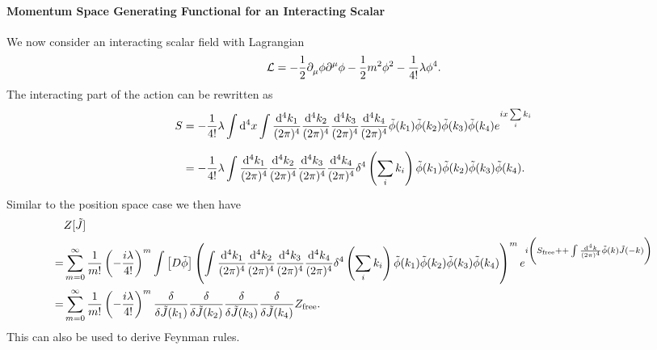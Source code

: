 \paragraph{Momentum Space Generating Functional for an Interacting Scalar}
We now consider an interacting scalar field with Lagrangian
\begin{align*}
	\mathcal{L} = -\frac{1}{2}\partial^{}_{\mu}\phi\partial^{\mu}_{}\phi - \frac{1}{2}m^{2}\phi^{2} - \frac{1}{4!}\lambda\phi^{4}.
\end{align*}
The interacting part of the action can be rewritten as
\begin{align*}
	S &= -\frac{1}{4!}\lambda\int\limits_{}^{}\dd[4]{x}\int\limits_{}^{}\frac{\dd[4]{k_{1}}}{(2\pi)^{4}}\frac{\dd[4]{k_{2}}}{(2\pi)^{4}}\frac{\dd[4]{k_{3}}}{(2\pi)^{4}}\frac{\dd[4]{k_{4}}}{(2\pi)^{4}}\tilde{\phi}(k_{1})\tilde{\phi}(k_{2})\tilde{\phi}(k_{3})\tilde{\phi}(k_{4})e^{ix\sum\limits_{i}k_{i}} \\
	  &= -\frac{1}{4!}\lambda\int\limits_{}^{}\frac{\dd[4]{k_{1}}}{(2\pi)^{4}}\frac{\dd[4]{k_{2}}}{(2\pi)^{4}}\frac{\dd[4]{k_{3}}}{(2\pi)^{4}}\frac{\dd[4]{k_{4}}}{(2\pi)^{4}}\delta^{4}\left(\sum\limits_{i}k_{i}\right)\tilde{\phi}(k_{1})\tilde{\phi}(k_{2})\tilde{\phi}(k_{3})\tilde{\phi}(k_{4}).
\end{align*}
Similar to the position space case we then have
\begin{align*}
	 &Z[\tilde{J}] \\
	=& \sum\limits_{m = 0}^{\infty}\frac{1}{m!}\left(-\frac{i\lambda}{4!}\right)^{m}\pinte{}{\tilde{\phi}}\left(\inte{}{}\frac{\dd[4]{k_{1}}}{(2\pi)^{4}}\frac{\dd[4]{k_{2}}}{(2\pi)^{4}}\frac{\dd[4]{k_{3}}}{(2\pi)^{4}}\frac{\dd[4]{k_{4}}}{(2\pi)^{4}}\delta^{4}\left(\sum\limits_{i}k_{i}\right)\tilde{\phi}(k_{1})\tilde{\phi}(k_{2})\tilde{\phi}(k_{3})\tilde{\phi}(k_{4})\right)^{m}e^{i\left(S_{\text{free}} +  + \inte{}{}\frac{\dd[4]{k}}{(2\pi)^{4}}\tilde{\phi}(k)\tilde{J}(-k)\right)} \\
	=& \sum\limits_{m = 0}^{\infty}\frac{1}{m!}\left(-\frac{i\lambda}{4!}\right)^{m}\fdv{\tilde{J}(k_{1})}\fdv{\tilde{J}(k_{2})}\fdv{\tilde{J}(k_{3})}\fdv{\tilde{J}(k_{4})}Z_{\text{free}}.
\end{align*}
This can also be used to derive Feynman rules.

